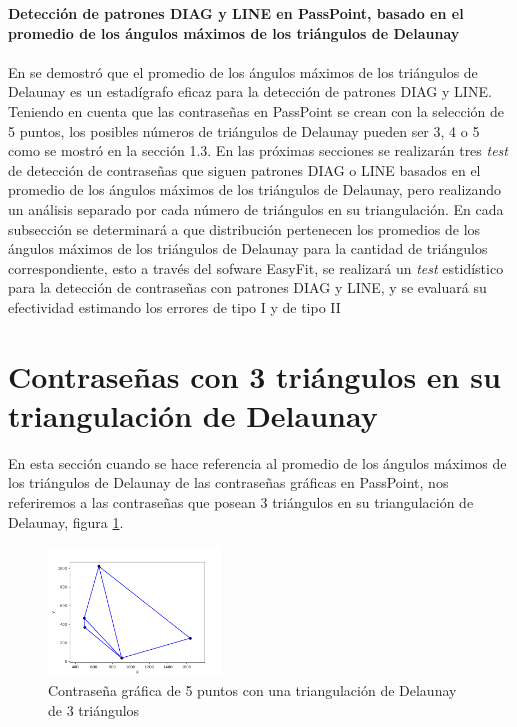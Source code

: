 \documentclass[12pt]{report}
\begin{document}
\vspace{-2em} %

\noindent\textbf{\LARGE Detección de patrones DIAG y LINE en PassPoint, basado en el promedio de los ángulos máximos de los triángulos de Delaunay}\\
\vspace{2em}
\\	
En \cite{13} se demostró que el promedio de los ángulos máximos de los triángulos de Delaunay es un estadígrafo eficaz para la detección de patrones DIAG y LINE. Teniendo en cuenta que las contraseñas en PassPoint se crean con la selección de 5 puntos, los posibles números de triángulos de Delaunay pueden ser 3, 4 o 5 como se mostró en la sección 1.3. En las próximas secciones se realizarán tres \textit{test} de detección de contraseñas  que siguen patrones DIAG o LINE basados en el promedio de los ángulos  máximos de los triángulos de Delaunay, pero  realizando un análisis separado por cada número de triángulos en su triangulación.
En cada subsección se determinará a que distribución pertenecen los promedios de los ángulos máximos de los triángulos de Delaunay para la cantidad de triángulos correspondiente, esto a través  del sofware EasyFit, se realizará un \textit{test} estidístico para la detección de contraseñas con patrones DIAG y LINE, y se evaluará su efectividad estimando los errores de  tipo I y de tipo II 


\setcounter{section}{0}
\section{Contraseñas con 3 triángulos en su triangulación de Delaunay }
En esta sección cuando se hace referencia  al promedio de los ángulos máximos de los triángulos de Delaunay  de las contraseñas gráficas en PassPoint, nos referiremos a las contraseñas que posean 3 triángulos en su triangulación de Delaunay, figura \ref{3TD}.
	\begin{figure}[ht]
	\centering
	
	\includegraphics[width=0.41\textwidth]{alea3td.png}
	\caption{Contraseña gráfica de 5 puntos con una triangulación de Delaunay de 3 triángulos}
	\label{3TD}
\end{figure}
\end{document}
